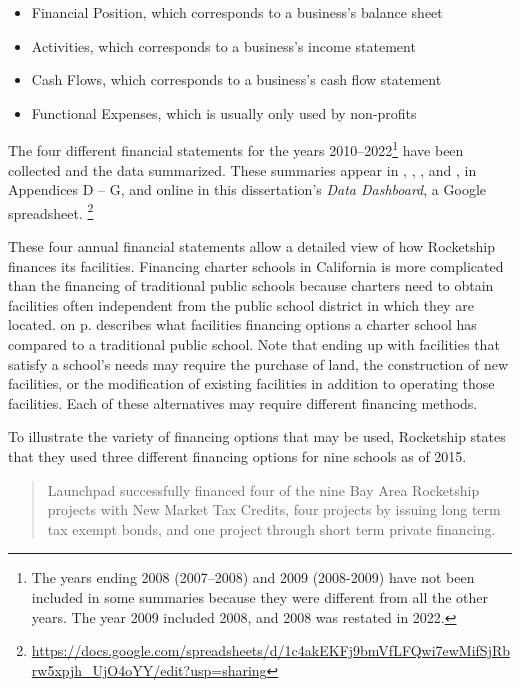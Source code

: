 \begin{itemize}
  \item Financial Position, which corresponds to a business's balance sheet
  \item Activities, which corresponds to a business's income statement
  \item Cash Flows, which corresponds to a business's cash flow statement
  \item Functional Expenses, which is usually only used by non-profits
\end{itemize}

The four different financial statements for the years 2010–2022\footnote{The years ending 2008 (2007–2008) and 2009 (2008-2009) have not been included in some summaries because they were different from all the other years. The year 2009 included 2008, and 2008 was restated in 2022.} have been collected and the data summarized. These summaries appear in , , , and , in Appendices D – G, and online in this dissertation's \textit{Data Dashboard}, a Google spreadsheet. \footnote{\url{https://docs.google.com/spreadsheets/d/1c4akEKFj9bmVfLFQwi7ewMifSjRbrw5xpjh_UjO4oYY/edit?usp=sharing}}

These four annual financial statements allow a detailed view of how Rocketship finances its facilities. Financing charter schools in California is more complicated than the financing of traditional public schools because charters need to obtain facilities often independent from the public school district in which they are located.
 on p.\pageref{tab:charter-school-financing} describes what facilities financing options a charter school has compared to a traditional public school. Note that ending up with facilities that satisfy a school's needs may require the purchase of land, the construction of new facilities, or the modification of existing facilities in addition to operating those facilities. Each of these alternatives may require different financing methods.

To illustrate the variety of financing options that may be used, Rocketship states that they used three different financing options for nine schools as of 2015.
\begin{quotation}\noindent
Launchpad successfully financed four of the nine Bay Area Rocketship projects with New Market Tax Credits, four projects by issuing long term tax exempt bonds, and one project through short term private financing. 
\end{quotation}

